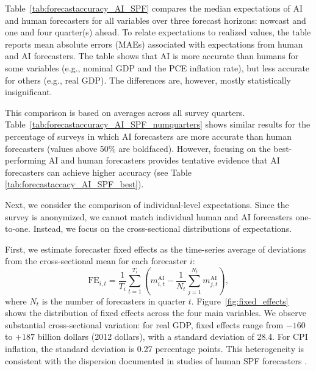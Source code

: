 \documentclass[11pt,letterpaper]{scrartcl}
\begin{document}
Table~\ref{tab:forecastaccuracy_AI_SPF} compares the median expectations of AI and human forecasters for all variables over three forecast horizons: nowcast and one and four quarter(s) ahead. To relate expectations to realized values, the table reports mean absolute errors (MAEs) associated with expectations from human and AI forecasters. The table shows that AI is more accurate than humans for some variables (e.g., nominal GDP and the PCE inflation rate), but less accurate for others (e.g., real GDP). The differences are, however, mostly statistically insignificant. 

This comparison is based on averages across all survey quarters. Table~\ref{tab:forecastaccuracy_AI_SPF_numquarters} shows similar results for the percentage of surveys in which AI forecasters are more accurate than human forecasters (values above 50\% are boldfaced). However, focusing on the best-performing AI and human forecasters provides tentative evidence that AI forecasters can achieve higher accuracy (see Table \ref{tab:forecastaccacy_AI_SPF_best}). 

Next, we consider the comparison of individual-level expectations. Since the survey is anonymized, we cannot match individual human and AI forecasters one-to-one. Instead, we focus on the cross-sectional distributions of expectations. 

First, we estimate forecaster fixed effects as the time-series average of deviations from the cross-sectional mean for each forecaster $i$:
\begin{equation}
\text{FE}_{i,t} = \frac{1}{T_i}\sum_{t=1}^{T_i} \left( m^\text{AI}_{i,t} - \frac{1}{N_t}\sum_{j=1}^{N_t} m^\text{AI}_{j,t}\right),
\end{equation}
where $N_t$ is the number of forecasters in quarter $t$. Figure~\ref{fig:fixed_effects} shows the distribution of fixed effects across the four main variables. We observe substantial cross-sectional variation: for real GDP, fixed effects range from $-160$ to $+187$ billion dollars (2012 dollars), with a standard deviation of 28.4. For CPI inflation, the standard deviation is 0.27 percentage points. This heterogeneity is consistent with the dispersion documented in studies of human SPF forecasters \citep{patton2010why}.
\end{document}
